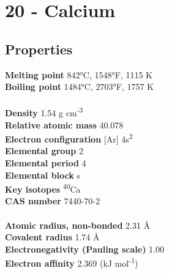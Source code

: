 \section{20 - Calcium}
\label{sec:elem-calcium}
\subsection{Properties}
\textbf{Melting point} 842°C, 1548°F, 1115 K\\
\textbf{Boiling point} 1484°C, 2703°F, 1757 K\\
\\
\textbf{Density} 1.54 g cm\textsuperscript{-3}\\
\textbf{Relative atomic mass} 40.078\\
\textbf{Electron configuration} [Ar] 4s\textsuperscript{2} \\
\textbf{Elemental group} 2\\
\textbf{Elemental period} 4\\
\textbf{Elemental block} s\\
\textbf{Key isotopes} \textsuperscript{40}Ca\\
\textbf{CAS number} 7440-70-2\\
\\
\textbf{Atomic radius, non-bonded} 2.31 Å\\
\textbf{Covalent radius} 1.74 Å\\
\textbf{Electronegativity (Pauling scale)} 1.00\\
\textbf{Electron affinity} 2.369 (kJ mol\textsuperscript{-1})\\